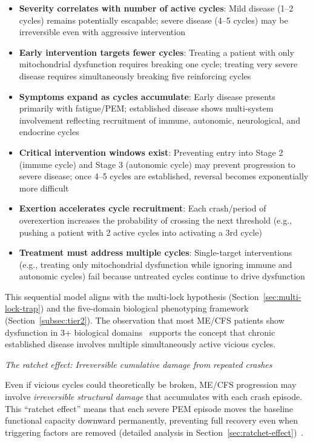 \begin{itemize}
    \item \textbf{Severity correlates with number of active cycles}: Mild disease (1--2 cycles) remains potentially escapable; severe disease (4--5 cycles) may be irreversible even with aggressive intervention

    \item \textbf{Early intervention targets fewer cycles}: Treating a patient with only mitochondrial dysfunction requires breaking one cycle; treating very severe disease requires simultaneously breaking five reinforcing cycles

    \item \textbf{Symptoms expand as cycles accumulate}: Early disease presents primarily with fatigue/PEM; established disease shows multi-system involvement reflecting recruitment of immune, autonomic, neurological, and endocrine cycles

    \item \textbf{Critical intervention windows exist}: Preventing entry into Stage 2 (immune cycle) and Stage 3 (autonomic cycle) may prevent progression to severe disease; once 4--5 cycles are established, reversal becomes exponentially more difficult

    \item \textbf{Exertion accelerates cycle recruitment}: Each crash/period of overexertion increases the probability of crossing the next threshold (e.g., pushing a patient with 2 active cycles into activating a 3rd cycle)

    \item \textbf{Treatment must address multiple cycles}: Single-target interventions (e.g., treating only mitochondrial dysfunction while ignoring immune and autonomic cycles) fail because untreated cycles continue to drive dysfunction
\end{itemize}

This sequential model aligns with the multi-lock hypothesis (Section~\ref{sec:multi-lock-trap}) and the five-domain biological phenotyping framework (Section~\ref{subsec:tier2}). The observation that most ME/CFS patients show dysfunction in 3+ biological domains~\cite{heng2025mecfs} supports the concept that chronic established disease involves multiple simultaneously active vicious cycles.

\textit{The ratchet effect: Irreversible cumulative damage from repeated crashes}

Even if vicious cycles could theoretically be broken, ME/CFS progression may involve \textit{irreversible structural damage} that accumulates with each crash episode. This ``ratchet effect'' means that each severe PEM episode moves the baseline functional capacity downward permanently, preventing full recovery even when triggering factors are removed (detailed analysis in Section~\ref{sec:ratchet-effect})~\cite{Chu2019,Maksoud2020natural}.

